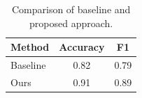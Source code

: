 \begin{table}[htbp]
  \centering
  \caption{Comparison of baseline and proposed approach.}
  \label{tab:results}
  \begin{tabular}{lcc}
    \toprule
    Method   & Accuracy & F1   \\
    \midrule
    Baseline & 0.82     & 0.79 \\
    Ours     & 0.91     & 0.89 \\
    \bottomrule
  \end{tabular}
\end{table}
